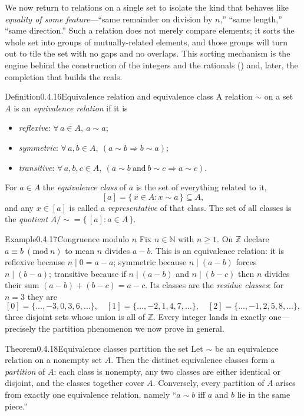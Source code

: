\documentclass[main.tex]{subfiles}
\begin{document}
\noindent We now return to relations on a single set to isolate the kind that behaves like
\emph{equality of some feature}---``same remainder on division by $n$,'' ``same length,'' ``same
direction.'' Such a relation does not merely compare elements; it sorts the whole set into groups of
mutually-related elements, and those groups will turn out to tile the set with no gaps and no overlaps.
This sorting mechanism is the engine behind the construction of the integers and the rationals
() and, later, the completion that builds the reals.

\begin{Obj}{Definition}{0.4.16}{Equivalence relation and equivalence class}
A relation $\sim$ on a set $A$ is an \emph{equivalence relation} if it is
\begin{itemize}
  \item \emph{reflexive}: $\forall\,a\in A,\ a\sim a$;
  \item \emph{symmetric}: $\forall\,a,b\in A,\ (a\sim b\Rightarrow b\sim a)$;
  \item \emph{transitive}: $\forall\,a,b,c\in A,\ (a\sim b\ \text{and}\ b\sim c\Rightarrow a\sim c)$.
\end{itemize}
For $a\in A$ the \emph{equivalence class} of $a$ is the set of everything related to it,
\[
[a]=\{\,x\in A : x\sim a\,\}\subseteq A,
\]
and any $x\in[a]$ is called a \emph{representative} of that class. The set of all classes is the
\emph{quotient} $A/{\sim}=\{\,[a] : a\in A\,\}$.
\end{Obj}

\begin{ObjL}{Example}{0.4.17}{Congruence modulo \texorpdfstring{$n$}{n}}
Fix $n\in\mathbb N$ with $n\ge 1$. On $\mathbb Z$ declare $a\equiv b\ (\mathrm{mod}\ n)$ to mean
$n$ divides $a-b$. This is an equivalence relation: it is reflexive because $n\mid 0=a-a$; symmetric
because $n\mid(a-b)$ forces $n\mid(b-a)$; transitive because if $n\mid(a-b)$ and $n\mid(b-c)$ then
$n$ divides their sum $(a-b)+(b-c)=a-c$. Its classes are the \emph{residue classes}: for $n=3$ they
are
\[
[0]=\{\dots,-3,0,3,6,\dots\},\quad
[1]=\{\dots,-2,1,4,7,\dots\},\quad
[2]=\{\dots,-1,2,5,8,\dots\},
\]
three disjoint sets whose union is all of $\mathbb Z$. Every integer lands in exactly one---precisely
the partition phenomenon we now prove in general.
\end{ObjL}

\begin{Obj}{Theorem}{0.4.18}{Equivalence classes partition the set}
Let $\sim$ be an equivalence relation on a nonempty set $A$. Then the distinct equivalence classes
form a \emph{partition} of $A$: each class is nonempty, any two classes are either identical or
disjoint, and the classes together cover $A$. Conversely, every partition of $A$ arises from exactly
one equivalence relation, namely ``$a\sim b$ iff $a$ and $b$ lie in the same piece.''
\end{Obj}
\end{document}
